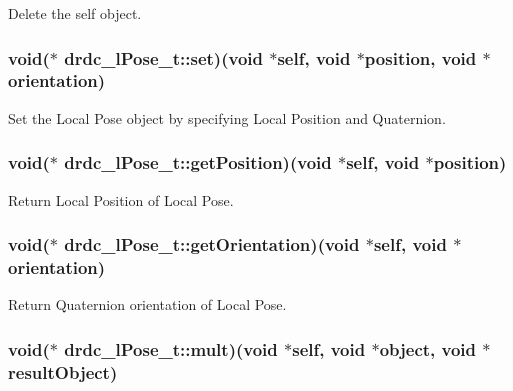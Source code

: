 Delete the self object. 

\hypertarget{structdrdc__lPose__t_fcc32b888211dce06e5ae90747281555}{
\subsubsection[set]{\setlength{\rightskip}{0pt plus 5cm}void($\ast$ {\bf drdc\_\-lPose\_\-t::set})(void $\ast$self, void $\ast$position, void $\ast$orientation)}}
\label{structdrdc__lPose__t_fcc32b888211dce06e5ae90747281555}


Set the Local Pose object by specifying Local Position and Quaternion. 

\hypertarget{structdrdc__lPose__t_7ea061e1553a860eb7c5ccbe07846948}{
\subsubsection[getPosition]{\setlength{\rightskip}{0pt plus 5cm}void($\ast$ {\bf drdc\_\-lPose\_\-t::getPosition})(void $\ast$self, void $\ast$position)}}
\label{structdrdc__lPose__t_7ea061e1553a860eb7c5ccbe07846948}


Return Local Position of Local Pose. 

\hypertarget{structdrdc__lPose__t_0bd925f93db71c6a83c72ae286588d03}{
\subsubsection[getOrientation]{\setlength{\rightskip}{0pt plus 5cm}void($\ast$ {\bf drdc\_\-lPose\_\-t::getOrientation})(void $\ast$self, void $\ast$orientation)}}
\label{structdrdc__lPose__t_0bd925f93db71c6a83c72ae286588d03}


Return Quaternion orientation of Local Pose. 

\hypertarget{structdrdc__lPose__t_a6f487a1f79398f7f4ff149d9fc2d931}{
\subsubsection[mult]{\setlength{\rightskip}{0pt plus 5cm}void($\ast$ {\bf drdc\_\-lPose\_\-t::mult})(void $\ast$self, void $\ast$object, void $\ast$resultObject)}}
\label{structdrdc__lPose__t_a6f487a1f79398f7f4ff149d9fc2d931}


